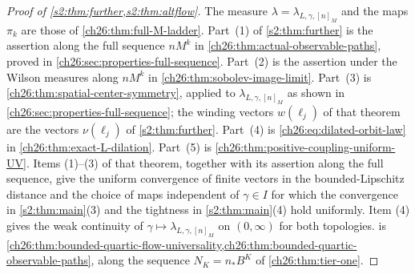 \begin{proof}[Proof of \cref{s2:thm:further,s2:thm:altflow}]
The measure $\lambda=\lambda_{L,\gamma,[n]_M}$ and the maps $\pi_k$ are those of \cref{ch26:thm:full-M-ladder}. Part~(1) of \cref{s2:thm:further} is the assertion along the full sequence $nM^k$ in \cref{ch26:thm:actual-observable-paths}, proved in \cref{ch26:sec:properties-full-sequence}. Part~(2) is the assertion under the Wilson measures along $nM^k$ in \cref{ch26:thm:sobolev-image-limit}. Part~(3) is \cref{ch26:thm:spatial-center-symmetry}, applied to $\lambda_{L,\gamma,[n]_M}$ as shown in \cref{ch26:sec:properties-full-sequence}; the winding vectors $w(\ell_j)$ of that theorem are the vectors $\nu(\ell_j)$ of \cref{s2:thm:further}. Part~(4) is \eqref{ch26:eq:dilated-orbit-law} in \cref{ch26:thm:exact-L-dilation}. Part~(5) is \cref{ch26:thm:positive-coupling-uniform-UV}. Items (1)--(3) of that theorem, together with its assertion along the full sequence, give the uniform convergence of finite vectors in the bounded-Lipschitz distance and the choice of maps independent of $\gamma\in I$ for which the convergence in \cref{s2:thm:main}(3) and the tightness in \cref{s2:thm:main}(4) hold uniformly. Item (4) gives the weak continuity of $\gamma\mapsto\lambda_{L,\gamma,[n]_M}$ on $(0,\infty)$ for both topologies.  is \cref{ch26:thm:bounded-quartic-flow-universality,ch26:thm:bounded-quartic-observable-paths}, along the sequence $N_K=n_*B^K$ of \cref{ch26:thm:tier-one}.
\end{proof}
